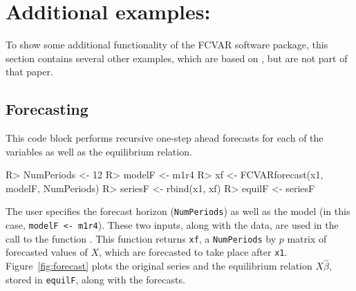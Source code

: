 \documentclass[article]{jss}
\newcommand{\fct}[1]{\code{#1()}}
\begin{document}
\section[Additional examples: MoreExamples.R]{Additional examples: }
\label{sec:examples}

To show some additional functionality of the FCVAR software package, this section contains several other examples, which are based on \cite{JNP2014}, but are not part of that paper.

\subsection{Forecasting}
\label{sec:forecasting}

This code block 
performs recursive one-step ahead forecasts for each of the variables as well as the equilibrium relation. 
%
%
\begin{Code}
R> NumPeriods <- 12
R> modelF <- m1r4
R> xf <- FCVARforecast(x1, modelF, NumPeriods)
R> seriesF <- rbind(x1, xf) 
R> equilF <- seriesF %
\end{Code}
%
%
%
The user specifies the forecast horizon (\verb|NumPeriods|) as well as the model (in this case, \verb|modelF <- m1r4|). These two inputs, along with the data, are used in the call to the function \fct{FCVARforecast}. This function returns \verb|xf|, a \verb|NumPeriods| by $p$ matrix of forecasted values of $X$, 
which are forecasted to take place after \verb|x1|. 
Figure~\ref{fig:forecast} plots the original series and the equilibrium relation $X\hat{\beta}$, stored in \verb|equilF|,  along with the forecasts. 
\end{document}
